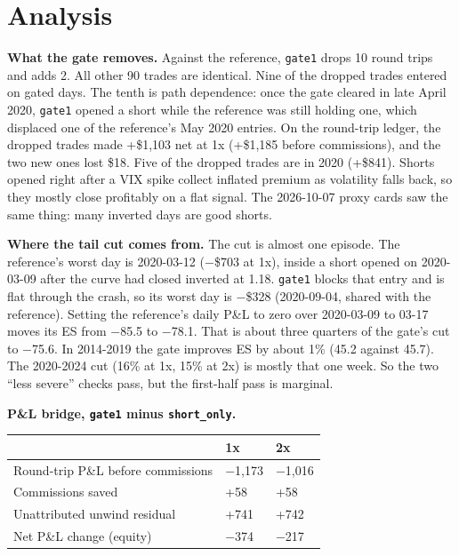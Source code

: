 \documentclass{article}
\begin{document}
\section{Analysis}

\textbf{What the gate removes.} Against the reference, \texttt{gate1} drops 10 round trips and adds 2. All other 90 trades are identical. Nine of the dropped trades entered on gated days. The tenth is path dependence: once the gate cleared in late April 2020, \texttt{gate1} opened a short while the reference was still holding one, which displaced one of the reference's May 2020 entries. On the round-trip ledger, the dropped trades made +\$1,103 net at 1x (+\$1,185 before commissions), and the two new ones lost \$18. Five of the dropped trades are in 2020 (+\$841). Shorts opened right after a VIX spike collect inflated premium as volatility falls back, so they mostly close profitably on a flat signal. The 2026-10-07 proxy cards saw the same thing: many inverted days are good shorts.

\textbf{Where the tail cut comes from.} The cut is almost one episode. The reference's worst day is 2020-03-12 (\ensuremath{-}\$703 at 1x), inside a short opened on 2020-03-09 after the curve had closed inverted at 1.18. \texttt{gate1} blocks that entry and is flat through the crash, so its worst day is \ensuremath{-}\$328 (2020-09-04, shared with the reference). Setting the reference's daily P\&L to zero over 2020-03-09 to 03-17 moves its ES from \ensuremath{-}85.5 to \ensuremath{-}78.1. That is about three quarters of the gate's cut to \ensuremath{-}75.6. In 2014-2019 the gate improves ES by about 1\% (45.2 against 45.7). The 2020-2024 cut (16\% at 1x, 15\% at 2x) is mostly that one week. So the two ``less severe'' checks pass, but the first-half pass is marginal.

\textbf{P\&L bridge, \texttt{gate1} minus \texttt{short\_\allowbreak{}only}.}

\begin{center}\small
\begin{tabularx}{\linewidth}{>{\raggedright\arraybackslash}X l l}
\toprule
\textbf{} & \textbf{1x} & \textbf{2x} \\
\midrule
Round-trip P\&L before commissions & \ensuremath{-}1,173 & \ensuremath{-}1,016 \\
Commissions saved & +58 & +58 \\
Unattributed unwind residual & +741 & +742 \\
Net P\&L change (equity) & \ensuremath{-}374 & \ensuremath{-}217 \\
\bottomrule
\end{tabularx}
\end{center}
\end{document}

